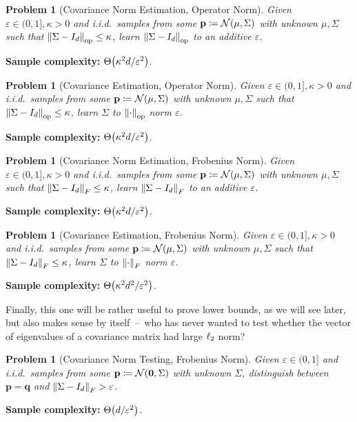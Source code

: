 \documentclass[10pt]{article}
\newcommand{\dst}{\varepsilon}
\newcommand{\dims}{d}
\newcommand{\p}{\mathbf{p}}
\newcommand{\q}{\mathbf{q}}
\renewcommand{\eqdef}{\coloneqq}
\theoremstyle{plain}
\newtheorem{problem}[theorem]{Problem}
\begin{document}
\begin{problem}[Covariance Norm Estimation, Operator Norm]
  \label{problem:cov:learn:norm:op}
  Given $\dst \in(0,1], \kappa >0$ and i.i.d.\ samples from some $\p\eqdef\gaussian{\mu}{\Sigma}$ with unknown $\mu,\Sigma$ such that $\norm{\Sigma- I_\dims}_{\rm op}\leq \kappa$, learn $\norm{\Sigma - I_\dims}_{\rm op}$ to an additive $\dst$.
\end{problem}
\hfill \textbf{Sample complexity:} $\bigTheta{\kappa^2\dims/\dst^2}$. 

\begin{problem}[Covariance Estimation, Operator Norm]
  \label{problem:cov:learn:op}
  Given $\dst \in(0,1], \kappa >0$ and i.i.d.\ samples from some $\p\eqdef\gaussian{\mu}{\Sigma}$ with unknown $\mu,\Sigma$ such that $\norm{\Sigma- I_\dims}_{\rm op}\leq \kappa$, learn $\Sigma$ to $\norm{\cdot}_{\rm op}$ norm $\dst$.
\end{problem}
\hfill \textbf{Sample complexity:} $\bigTheta{\kappa^2\dims/\dst^2}$. 

\begin{problem}[Covariance Norm Estimation, Frobenius Norm]
  \label{problem:cov:learn:norm:frob}
  Given $\dst \in(0,1], \kappa >0$ and i.i.d.\ samples from some $\p\eqdef\gaussian{\mu}{\Sigma}$ with unknown $\mu,\Sigma$ such that $\norm{\Sigma- I_\dims}_{F}\leq \kappa$, learn $\norm{\Sigma-I_\dims}_{F}$ to an additive $\dst$.
\end{problem}
\hfill \textbf{Sample complexity:} $\bigTheta{\kappa^2\dims/\dst^2}$. 

\begin{problem}[Covariance Estimation, Frobenius Norm]
  \label{problem:cov:learn:frob}
  Given $\dst \in(0,1], \kappa>0$ and i.i.d.\ samples from some $\p\eqdef\gaussian{\mu}{\Sigma}$ with unknown $\mu,\Sigma$ such that $\norm{\Sigma - I_\dims}_{F}\leq \kappa$, learn $\Sigma$ to $\norm{\cdot}_{F}$ norm $\dst$.
\end{problem}
\hfill \textbf{Sample complexity:} $\bigTheta{\kappa^2\dims^2/\dst^2}$. 

Finally, this one will be rather useful to prove lower bounds, as we will see later, but also makes sense by itself~--~who has never wanted to test whether the vector of eigenvalues of a covariance matrix had large $\lp[2]$ norm?
\begin{problem}[Covariance Norm Testing, Frobenius Norm]
  \label{problem:cov:test:norm:frob}
  Given $\dst \in(0,1]$ and i.i.d.\ samples from some $\p\eqdef\gaussian{\mathbf{0}}{\Sigma}$ with unknown $\Sigma$, distinguish between $\p=\q$ and $\norm{\Sigma-I_\dims}_{F}>\dst$.
\end{problem}
\hfill \textbf{Sample complexity:} $\bigTheta{\dims/\dst^2}$. 
\end{document}

